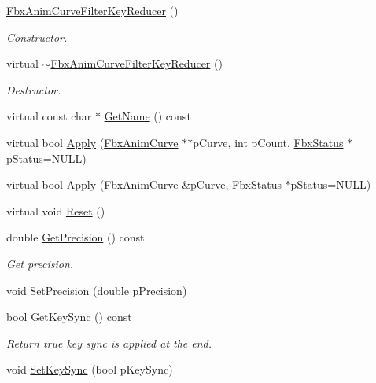 \begin{DoxyCompactItemize}
\item 
\hyperlink{class_fbx_anim_curve_filter_key_reducer_ad43e77bed0728ae7cd9f24e33753f984}{Fbx\+Anim\+Curve\+Filter\+Key\+Reducer} ()
\begin{DoxyCompactList}\small\item\em Constructor. \end{DoxyCompactList}\item 
virtual \hyperlink{class_fbx_anim_curve_filter_key_reducer_a69f345185767183595a34df13ae713c2}{$\sim$\+Fbx\+Anim\+Curve\+Filter\+Key\+Reducer} ()
\begin{DoxyCompactList}\small\item\em Destructor. \end{DoxyCompactList}\item 
virtual const char $\ast$ \hyperlink{class_fbx_anim_curve_filter_key_reducer_a86d571282e550eecbf7afb0f198ce91f}{Get\+Name} () const
\item 
virtual bool \hyperlink{class_fbx_anim_curve_filter_key_reducer_a8c0c58b8f2e4272bc5f257570daf5ba1}{Apply} (\hyperlink{class_fbx_anim_curve}{Fbx\+Anim\+Curve} $\ast$$\ast$p\+Curve, int p\+Count, \hyperlink{class_fbx_status}{Fbx\+Status} $\ast$p\+Status=\hyperlink{fbxarch_8h_a070d2ce7b6bb7e5c05602aa8c308d0c4}{N\+U\+LL})
\item 
virtual bool \hyperlink{class_fbx_anim_curve_filter_key_reducer_a8b2b0d1d3eaeb8d1333be55211a75b1a}{Apply} (\hyperlink{class_fbx_anim_curve}{Fbx\+Anim\+Curve} \&p\+Curve, \hyperlink{class_fbx_status}{Fbx\+Status} $\ast$p\+Status=\hyperlink{fbxarch_8h_a070d2ce7b6bb7e5c05602aa8c308d0c4}{N\+U\+LL})
\item 
virtual void \hyperlink{class_fbx_anim_curve_filter_key_reducer_a52e9e7476a3c4e55ad7c41c978b92cd5}{Reset} ()
\item 
double \hyperlink{class_fbx_anim_curve_filter_key_reducer_abd457aef2c4da70a5a6657947f078988}{Get\+Precision} () const
\begin{DoxyCompactList}\small\item\em Get precision. \end{DoxyCompactList}\item 
void \hyperlink{class_fbx_anim_curve_filter_key_reducer_a36e172b2c259e383897828f10036e277}{Set\+Precision} (double p\+Precision)
\item 
bool \hyperlink{class_fbx_anim_curve_filter_key_reducer_a82cb456079577735e58cba071eed3a12}{Get\+Key\+Sync} () const
\begin{DoxyCompactList}\small\item\em Return {\ttfamily true} key sync is applied at the end. \end{DoxyCompactList}\item 
void \hyperlink{class_fbx_anim_curve_filter_key_reducer_adf95529fab4de5a4e3a8d3112d6ba722}{Set\+Key\+Sync} (bool p\+Key\+Sync)
\end{DoxyCompactItemize}

